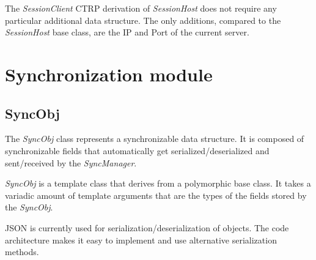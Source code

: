 \documentclass{report}
\begin{document}
                The \emph{SessionClient} CTRP derivation of \emph{SessionHost} does not require any particular additional data structure. The only additions, compared to the \emph{SessionHost} base class, are the IP and Port of the current server.

    \newpage

    \chapter{Synchronization module}

        \section{SyncObj}
            The \emph{SyncObj} class represents a synchronizable data structure. 
            It is composed of synchronizable fields that automatically get serialized/deserialized and sent/received by the \emph{SyncManager}.

            \emph{SyncObj} is a template class that derives from a polymorphic base class. 
            It takes a variadic amount of template arguments that are the types of the fields stored by the \emph{SyncObj}.

            JSON is currently used for serialization/deserialization of objects. 
            The code architecture makes it easy to implement and use alternative serialization methods.
\end{document}
